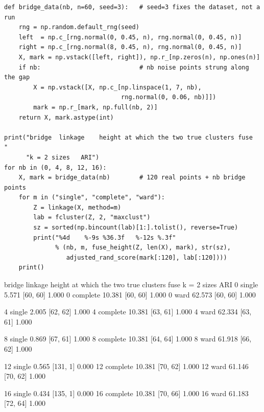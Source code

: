 \documentclass[11pt]{article}
\begin{document}
\begin{lstlisting}
def bridge_data(nb, n=60, seed=3):   # seed=3 fixes the dataset, not a run
    rng = np.random.default_rng(seed)
    left  = np.c_[rng.normal(0, 0.45, n), rng.normal(0, 0.45, n)]
    right = np.c_[rng.normal(8, 0.45, n), rng.normal(0, 0.45, n)]
    X, mark = np.vstack([left, right]), np.r_[np.zeros(n), np.ones(n)]
    if nb:                           # nb noise points strung along the gap
        X = np.vstack([X, np.c_[np.linspace(1, 7, nb),
                                rng.normal(0, 0.06, nb)]])
        mark = np.r_[mark, np.full(nb, 2)]
    return X, mark.astype(int)

print("bridge  linkage    height at which the two true clusters fuse   "
      "k = 2 sizes   ARI")
for nb in (0, 4, 8, 12, 16):
    X, mark = bridge_data(nb)        # 120 real points + nb bridge points
    for m in ("single", "complete", "ward"):
        Z = linkage(X, method=m)
        lab = fcluster(Z, 2, "maxclust")
        sz = sorted(np.bincount(lab)[1:].tolist(), reverse=True)
        print("%4d    %-9s %36.3f   %-12s %.3f"
              % (nb, m, fuse_height(Z, len(X), mark), str(sz),
                 adjusted_rand_score(mark[:120], lab[:120])))
    print()
\end{lstlisting}
\begin{codeout}
bridge  linkage    height at which the two true clusters fuse   k = 2 sizes   ARI
   0    single                                   5.571   [60, 60]     1.000
   0    complete                                10.381   [60, 60]     1.000
   0    ward                                    62.573   [60, 60]     1.000

   4    single                                   2.005   [62, 62]     1.000
   4    complete                                10.381   [63, 61]     1.000
   4    ward                                    62.334   [63, 61]     1.000

   8    single                                   0.869   [67, 61]     1.000
   8    complete                                10.381   [64, 64]     1.000
   8    ward                                    61.918   [66, 62]     1.000

  12    single                                   0.565   [131, 1]     0.000
  12    complete                                10.381   [70, 62]     1.000
  12    ward                                    61.146   [70, 62]     1.000

  16    single                                   0.434   [135, 1]     0.000
  16    complete                                10.381   [70, 66]     1.000
  16    ward                                    61.183   [72, 64]     1.000
\end{codeout}
\end{document}
